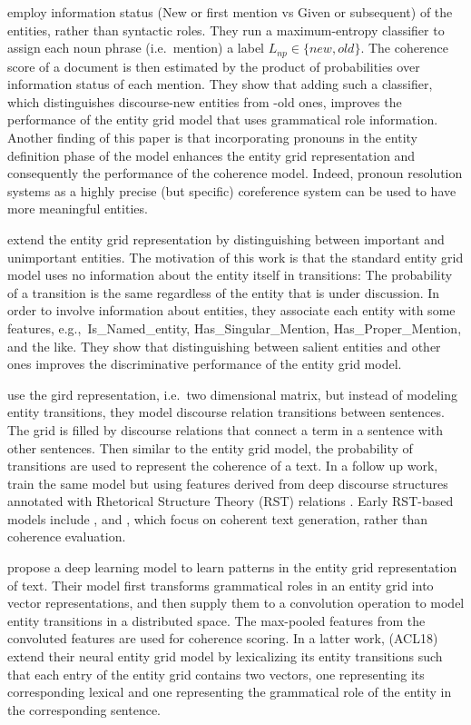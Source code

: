  employ information status (New or first mention vs Given or subsequent) of the entities, rather than syntactic roles. 
They run a maximum-entropy classifier to assign each noun phrase (i.e.\ mention) a label $L_{np} \in \lbrace new, old \rbrace$. 
The coherence score of a document is then estimated by the product of probabilities over information status of each mention. 
They show that adding such a classifier, which distinguishes discourse-new entities from -old ones, improves the performance of the entity grid model that uses grammatical role information.  
Another finding of this paper is that incorporating pronouns in the entity definition phase of the model enhances the entity grid representation and consequently the performance of the coherence model. 
Indeed, pronoun resolution systems as a highly precise (but specific) coreference system can be used to have more meaningful entities. 

 extend the entity grid representation by distinguishing between important and unimportant entities. 
The motivation of this work is that the standard entity grid model uses no information about the entity itself in transitions: The probability of a transition is the same regardless of the entity that is under discussion. 
In order to involve information about entities, they associate each entity with some features, e.g.,\ Is\_Named\_entity, Has\_Singular\_Mention, Has\_Proper\_Mention, and the like. 
They show that distinguishing between salient entities and other ones improves the discriminative performance of the entity grid model. 

 use the gird representation, i.e.\ two dimensional matrix, but instead of modeling entity transitions, they model discourse relation transitions between sentences. 
The grid is filled by discourse relations that connect a term in a sentence with other sentences. 
Then similar to the entity grid model, the probability of transitions are used to represent the coherence of a text. 
In a follow up work,  train the same model but using features derived from deep discourse structures annotated with Rhetorical Structure Theory (RST) relations \cite{mann88,prasad08a}. 
Early RST-based models include , and , which focus on coherent text generation, rather than coherence evaluation.

 propose a deep learning model to learn patterns in the entity grid representation of text. 
Their model first transforms grammatical roles in an entity grid into vector representations, and then supply them to a convolution operation to model entity transitions in a distributed space. 
The max-pooled features from the convoluted features are used for coherence scoring. 
In a latter work,  (ACL18) extend their neural entity grid model by lexicalizing its entity transitions such that each entry of the entity grid contains two vectors, one representing its corresponding lexical and one representing the grammatical role of the entity in the corresponding sentence.  


